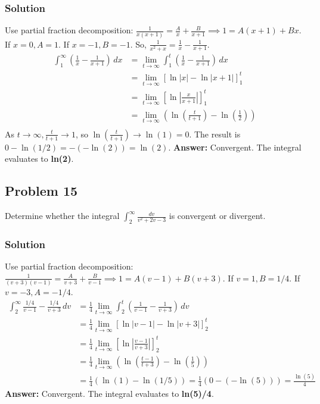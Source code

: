 \documentclass{article}
\begin{document}
\subsubsection*{Solution}
Use partial fraction decomposition: $ \frac{1}{x(x+1)} = \frac{A}{x} + \frac{B}{x+1} \implies 1 = A(x+1) + Bx $.
If $ x=0, A=1 $. If $ x=-1, B=-1 $. So, $ \frac{1}{x^2+x} = \frac{1}{x} - \frac{1}{x+1} $.
\begin{align*}
    \int_{1}^{\infty} \left(\frac{1}{x} - \frac{1}{x+1}\right) \,dx &= \lim_{t \to \infty} \int_{1}^{t} \left(\frac{1}{x} - \frac{1}{x+1}\right) \,dx \\
    &= \lim_{t \to \infty} \left[ \ln|x| - \ln|x+1| \right]_{1}^{t} \\
    &= \lim_{t \to \infty} \left[ \ln\left|\frac{x}{x+1}\right| \right]_{1}^{t} \\
    &= \lim_{t \to \infty} \left( \ln\left(\frac{t}{t+1}\right) - \ln\left(\frac{1}{2}\right) \right) \\
\end{align*}
As $ t \to \infty, \frac{t}{t+1} \to 1 $, so $ \ln(\frac{t}{t+1}) \to \ln(1) = 0 $.
The result is $ 0 - \ln(1/2) = -(-\ln(2)) = \ln(2) $.
\textbf{Answer:} Convergent. The integral evaluates to \textbf{ln(2)}.

\subsection{Problem 15}
Determine whether the integral $ \int_{2}^{\infty} \frac{dv}{v^2+2v-3} $ is convergent or divergent.
\subsubsection*{Solution}
Use partial fraction decomposition: $ \frac{1}{(v+3)(v-1)} = \frac{A}{v+3} + \frac{B}{v-1} \implies 1 = A(v-1) + B(v+3) $.
If $ v=1, B=1/4 $. If $ v=-3, A=-1/4 $.
\begin{align*}
    \int_{2}^{\infty} \frac{1/4}{v-1} - \frac{1/4}{v+3} \,dv &= \frac{1}{4} \lim_{t \to \infty} \int_{2}^{t} \left(\frac{1}{v-1} - \frac{1}{v+3}\right) \,dv \\
    &= \frac{1}{4} \lim_{t \to \infty} \left[ \ln|v-1| - \ln|v+3| \right]_{2}^{t} \\
    &= \frac{1}{4} \lim_{t \to \infty} \left[ \ln\left|\frac{v-1}{v+3}\right| \right]_{2}^{t} \\
    &= \frac{1}{4} \lim_{t \to \infty} \left( \ln\left(\frac{t-1}{t+3}\right) - \ln\left(\frac{1}{5}\right) \right) \\
    &= \frac{1}{4} ( \ln(1) - \ln(1/5) ) = \frac{1}{4} (0 - (-\ln(5))) = \frac{\ln(5)}{4}
\end{align*}
\textbf{Answer:} Convergent. The integral evaluates to \textbf{ln(5)/4}.
\end{document}
